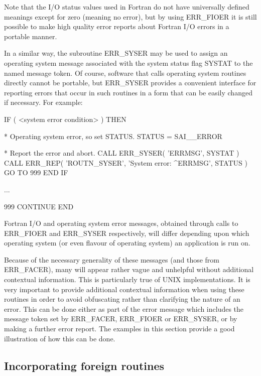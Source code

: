 \documentclass[twoside,11pt]{starlink}
\begin{document}
Note that the I/O status values used in Fortran do not have universally
defined meanings except for zero (meaning no error), but by using
ERR\_FIOER it is still possible to make high quality error reports about
Fortran I/O errors in a portable manner.

In a similar way, the subroutine ERR\_SYSER may be used to assign an
operating system message associated with the
system status flag SYSTAT to the named message token.
Of course, software that calls operating system routines directly cannot be
portable, but ERR\_SYSER provides a convenient interface for reporting
errors that occur in such routines in a form that can be easily changed if
necessary.
For example:

\begin {small}
\begin{terminalv}
      IF ( <system error condition> ) THEN

*     Operating system error, so set STATUS.
         STATUS = SAI__ERROR

*     Report the error and abort.
         CALL ERR_SYSER( 'ERRMSG', SYSTAT )
         CALL ERR_REP( 'ROUTN_SYSER', 'System error: ^ERRMSG', STATUS )
         GO TO 999
      END IF

      ...

 999  CONTINUE
      END
\end{terminalv}
\end {small}

Fortran I/O and operating system error messages, obtained through calls to
ERR\_FIOER and ERR\_SYSER respectively, will differ depending upon which
operating system (or even flavour of operating system) an application is run on.

Because of the necessary generality of these messages (and those from
ERR\_FACER), many will appear rather vague and unhelpful without additional
contextual information.
This is particularly true of UNIX implementations.
It is very important to provide additional contextual information when using
these routines in order to avoid obfuscating rather than clarifying the nature
of an error.
This can be done either as part of the error message which includes the message
token set by ERR\_FACER, ERR\_FIOER or ERR\_SYSER, or by making a further
error report.
The examples in this section provide a good illustration of how this can
be done.


\subsection{Incorporating foreign routines \label{foreign_sect}}
\end{document}
